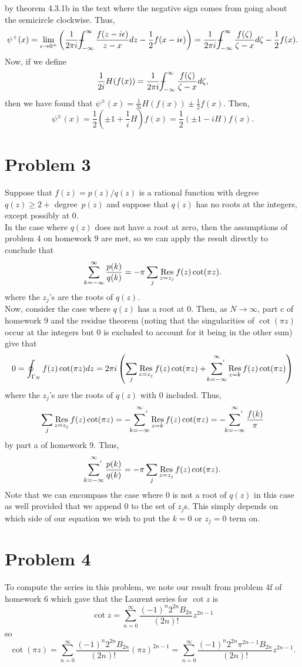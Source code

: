 \documentclass{article}
\begin{document}
by theorem 4.3.1b in the text where the negative sign comes from going about the semicircle clockwise. Thus, 
\[
\psi^+(x)=\lim_{\epsilon\to0^+}\left(\frac{1}{2\pi i}\pvint_{-\infty}^{\infty}\frac{f(z-i\epsilon)}{z-x}dz-\frac{1}{2}f(x-i\epsilon)\right)=\frac{1}{2\pi i}\pvint_{-\infty}^{\infty}\frac{f(\zeta)}{\zeta-x}d\zeta-\frac{1}{2}f(x).
\]
Now, if we define 
\[
\frac{1}{2i}H(f(x))=\frac{1}{2\pi i}\pvint_{-\infty}^{\infty}\frac{f(\zeta)}{\zeta-x}d\zeta,
\]
then we have found that $\psi^{\pm}(x)=\frac{1}{2i}H(f(x))\pm\frac{1}{2}f(x)$. Then, 
\[
\psi^{\pm}(x)=\frac{1}{2}\left(\pm1+\frac{1}{i}H\right)f(x)=\frac{1}{2}(\pm1-iH)f(x).
\]

\section{Problem 3}
Suppose that $f(z)=p(z)/q(z)$ is a rational function with
    degree~$q(z)\geq2+$ degree~$p(z)$ and suppose that $q(z)$ has no roots
    at the integers, except possibly at 0.\\
In the case where $q(z)$ does not have a root at zero, then the assumptions of problem 4 on homework 9 are met, so we can apply the result directly to conclude that 
\[
\sum_{k=-\infty}^\infty\frac{p(k)}{q(k)}=-\pi\sum_j\operatorname*{Res}_{z=z_j} f(z)\cot(\pi z).
\]
where the $z_j$'s are the roots of $q(z)$. \\
Now, consider the case where $q(z)$ has a root at 0. Then, as $N\to\infty$, part c of homework 9 and the residue theorem (noting that the singularities of $\cot(\pi z)$ occur at the integers but 0 is excluded to account for it being in the other sum) give that 
\[
0=\oint_{\Gamma_N}f(z)\cot(\pi z)dz=2\pi i\left(\sum_j\operatorname*{Res}_{z=z_j} f(z)\cot(\pi z)+\sideset{}{^{'}}\sum_{k=-\infty}^\infty\operatorname*{Res}_{z=k}f(z)\cot(\pi z)\right)
\]
where the $z_j$'s are the roots of $q(z)$ with 0 included. Thus, 
\[
\sum_j\operatorname*{Res}_{z=z_j} f(z)\cot(\pi z)=-\sideset{}{^{'}}\sum_{k=-\infty}^\infty\operatorname*{Res}_{z=k}f(z)\cot(\pi z)=-\sideset{}{^{'}}\sum_{k=-\infty}^\infty\frac{f(k)}{\pi}
\]
by part a of homework 9. Thus,
\[
\sideset{}{^{'}}\sum_{k=-\infty}^\infty\frac{p(k)}{q(k)}=-\pi\sum_j\operatorname*{Res}_{z=z_j} f(z)\cot(\pi z).
\]
Note that we can encompass the case where 0 is not a root of $q(z)$ in this case as well provided that we append 0 to the set of $z_j$s. This simply depends on which side of our equation we wish to put the $k=0$ or $z_j=0$ term on.

\section{Problem 4}
To compute the series in this problem, we note our result from problem 4f of homework 6 which gave that the Laurent series for $\cot z$ is
\[
\cot z=\sum_{n=0}^\infty \frac{(-1)^n2^{2n}B_{2n}}{(2n)!}z^{2n-1}
\]
so 
\[
\cot(\pi z)=\sum_{n=0}^\infty \frac{(-1)^n2^{2n}B_{2n}}{(2n)!}(\pi z)^{2n-1}=\sum_{n=0}^\infty \frac{(-1)^n2^{2n}\pi^{2n-1}B_{2n}}{(2n)!}z^{2n-1}.
\]
\end{document}
